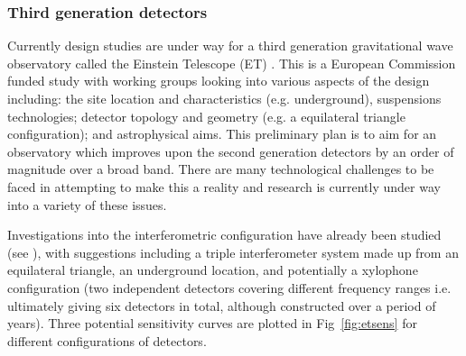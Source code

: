 \documentclass{article}
\begin{document}
\subsubsection{Third generation detectors}
Currently design studies are under way for a third generation gravitational wave
observatory called the Einstein Telescope (ET) \cite{ETweb}. This is a European
Commission funded study with working groups looking into various aspects of the
design including: the site location and characteristics (e.g. underground),
suspensions technologies; detector topology and geometry (e.g. a equilateral
triangle configuration); and astrophysical aims. This preliminary plan is to
aim for an observatory which improves upon the second generation detectors by
an order of magnitude over a broad band. There are many technological
challenges to be faced in attempting to make this a reality and research is
currently under way into a variety of these issues.

Investigations into the interferometric configuration have already been studied
(see \cite{Freise:2008, Hild:2008b, Hild:2010}), with suggestions including a triple
interferometer system made up from an equilateral triangle, an underground
location, and potentially a xylophone configuration (two independent detectors
covering different frequency ranges i.e. ultimately giving six detectors in 
total, although constructed over a period of years). Three potential sensitivity
curves are plotted in Fig~\ref{fig:etsens} for different configurations of detectors.

\end{document}
